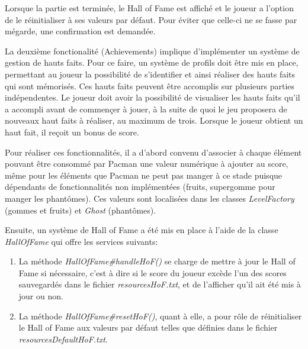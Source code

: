 \documentclass[12pt, openany]{report}
\begin{document}
Lorsque la partie est terminée, le Hall of Fame est affiché et le joueur a l'option de le réinitialiser à ses valeurs par défaut. Pour éviter que celle-ci ne se fasse par mégarde, une confirmation est demandée.

La deuxième fonctionalité (Achievements) implique d'implémenter un système de gestion de hauts faits. 
Pour ce faire, un système de profils doit être mis en place, permettant au joueur la possibilité de s'identifier et ainsi réaliser des hauts faits qui sont mémorisés.
Ces hauts faits peuvent être accomplis sur plusieurs parties indépendentes.
Le joueur doit avoir la possibilité de visualiser les hauts faits qu'il a accompli avant de commençer à jouer, à la suite de quoi le jeu proposera de nouveaux haut faits à réaliser, au maximum de trois.
Lorsque le joueur obtient un haut fait, il reçoit un bonus de score.

Pour réaliser ces fonctionnalités, il a d'abord convenu d'associer à chaque élément pouvant être consommé par Pacman une valeur numérique à ajouter au score, même pour les éléments que Pacman ne peut pas manger à ce stade puisque dépendants de fonctionnalités non implémentées (fruits, supergomme pour manger les phantômes).
Ces valeurs sont localisées dans les classes \mbox{\textit{LevelFactory}} (gommes et fruits) et \mbox{\textit{Ghost}} (phantômes).

Ensuite, un système de Hall of Fame a été mis en place à l'aide de la classe \mbox{\textit{HallOfFame}} qui offre les services suivants:

\begin{enumerate}
\item La méthode \mbox{\textit{HallOfFame\#handleHoF()}} se charge de mettre à jour le Hall of Fame si nécessaire, c'est à dire si le score du joueur excède l'un des scores sauvegardés dans le fichier \mbox{\textit{resources\\HoF.txt}}, et de l'afficher qu'il ait été mis à jour ou non.
\item La méthode \mbox{\textit{HallOfFame\#resetHoF()}}, quant à elle, a pour rôle de réinitialiser le Hall of Fame aux valeurs par défaut telles que définies dans le fichier \mbox{\textit{resources\\DefaultHoF.txt}}.
\end{enumerate}
\end{document}
